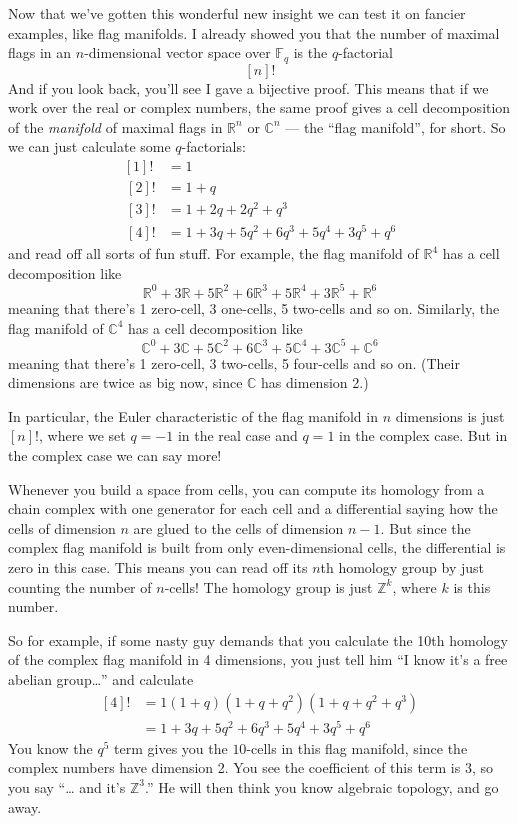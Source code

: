 \documentclass{article}
\begin{document}
Now that we've gotten this wonderful new insight we can test it on
fancier examples, like flag manifolds. I already showed you that the
number of maximal flags in an \(n\)-dimensional vector space over
\(\mathbb{F}_q\) is the \(q\)-factorial \[[n]!\] And if you look back,
you'll see I gave a bijective proof. This means that if we work over the
real or complex numbers, the same proof gives a cell decomposition of
the \emph{manifold} of maximal flags in \(\mathbb{R}^n\) or
\(\mathbb{C}^n\) --- the ``flag manifold'', for short. So we can just
calculate some \(q\)-factorials: \[
  \begin{aligned}
    [1]! &= 1
  \\\,[2]! &= 1 + q
  \\\,[3]! &= 1 + 2q + 2q^2 + q^3 
  \\\,[4]! &= 1 + 3q + 5q^2 + 6q^3 + 5q^4 + 3q^5 + q^6
  \end{aligned}
\] and read off all sorts of fun stuff. For example, the flag manifold
of \(\mathbb{R}^4\) has a cell decomposition like
\[\mathbb{R}^0 + 3\mathbb{R} + 5\mathbb{R}^2 + 6\mathbb{R}^3 + 5\mathbb{R}^4 + 3\mathbb{R}^5 + \mathbb{R}^6\]
meaning that there's 1 zero-cell, 3 one-cells, 5 two-cells and so on.
Similarly, the flag manifold of \(\mathbb{C}^4\) has a cell
decomposition like
\[\mathbb{C}^0 + 3\mathbb{C} + 5\mathbb{C}^2 + 6\mathbb{C}^3 + 5\mathbb{C}^4 + 3\mathbb{C}^5 + \mathbb{C}^6\]
meaning that there's 1 zero-cell, 3 two-cells, 5 four-cells and so on.
(Their dimensions are twice as big now, since \(\mathbb{C}\) has
dimension 2.)

In particular, the Euler characteristic of the flag manifold in \(n\)
dimensions is just \([n]!\), where we set \(q = -1\) in the real case
and \(q = 1\) in the complex case. But in the complex case we can say
more!

Whenever you build a space from cells, you can compute its homology from
a chain complex with one generator for each cell and a differential
saying how the cells of dimension \(n\) are glued to the cells of
dimension \(n-1\). But since the complex flag manifold is built from
only even-dimensional cells, the differential is zero in this case. This
means you can read off its \(n\)th homology group by just counting the
number of \(n\)-cells! The homology group is just \(\mathbb{Z}^k\),
where \(k\) is this number.

So for example, if some nasty guy demands that you calculate the 10th
homology of the complex flag manifold in 4 dimensions, you just tell him
``I know it's a free abelian group\ldots{}'' and calculate \[
  \begin{aligned}
    [4]! &= 1 (1 + q) (1 + q + q^2) (1 + q + q^2 + q^3) 
  \\&= 1 + 3q + 5q^2 + 6q^3 + 5q^4 + 3q^5 + q^6
  \end{aligned}
\] You know the \(q^5\) term gives you the \(10\)-cells in this flag
manifold, since the complex numbers have dimension 2. You see the
coefficient of this term is \(3\), so you say ``\ldots{} and it's
\(\mathbb{Z}^3\).'' He will then think you know algebraic topology, and
go away.
\end{document}
